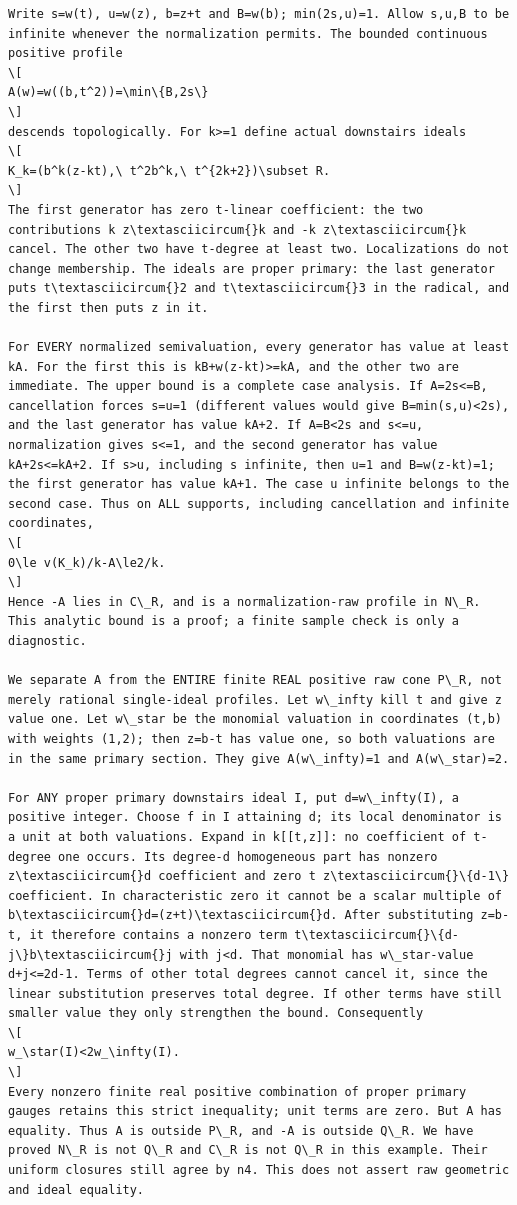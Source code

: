 \documentclass[
]{article}
\begin{document}
\begin{verbatim}
Write s=w(t), u=w(z), b=z+t and B=w(b); min(2s,u)=1. Allow s,u,B to be infinite whenever the normalization permits. The bounded continuous positive profile
\[
A(w)=w((b,t^2))=\min\{B,2s\}
\]
descends topologically. For k>=1 define actual downstairs ideals
\[
K_k=(b^k(z-kt),\ t^2b^k,\ t^{2k+2})\subset R.
\]
The first generator has zero t-linear coefficient: the two contributions k z\textasciicircum{}k and -k z\textasciicircum{}k cancel. The other two have t-degree at least two. Localizations do not change membership. The ideals are proper primary: the last generator puts t\textasciicircum{}2 and t\textasciicircum{}3 in the radical, and the first then puts z in it.

For EVERY normalized semivaluation, every generator has value at least kA. For the first this is kB+w(z-kt)>=kA, and the other two are immediate. The upper bound is a complete case analysis. If A=2s<=B, cancellation forces s=u=1 (different values would give B=min(s,u)<2s), and the last generator has value kA+2. If A=B<2s and s<=u, normalization gives s<=1, and the second generator has value kA+2s<=kA+2. If s>u, including s infinite, then u=1 and B=w(z-kt)=1; the first generator has value kA+1. The case u infinite belongs to the second case. Thus on ALL supports, including cancellation and infinite coordinates,
\[
0\le v(K_k)/k-A\le2/k.
\]
Hence -A lies in C\_R, and is a normalization-raw profile in N\_R. This analytic bound is a proof; a finite sample check is only a diagnostic.

We separate A from the ENTIRE finite REAL positive raw cone P\_R, not merely rational single-ideal profiles. Let w\_infty kill t and give z value one. Let w\_star be the monomial valuation in coordinates (t,b) with weights (1,2); then z=b-t has value one, so both valuations are in the same primary section. They give A(w\_infty)=1 and A(w\_star)=2.

For ANY proper primary downstairs ideal I, put d=w\_infty(I), a positive integer. Choose f in I attaining d; its local denominator is a unit at both valuations. Expand in k[[t,z]]: no coefficient of t-degree one occurs. Its degree-d homogeneous part has nonzero z\textasciicircum{}d coefficient and zero t z\textasciicircum{}\{d-1\} coefficient. In characteristic zero it cannot be a scalar multiple of b\textasciicircum{}d=(z+t)\textasciicircum{}d. After substituting z=b-t, it therefore contains a nonzero term t\textasciicircum{}\{d-j\}b\textasciicircum{}j with j<d. That monomial has w\_star-value d+j<=2d-1. Terms of other total degrees cannot cancel it, since the linear substitution preserves total degree. If other terms have still smaller value they only strengthen the bound. Consequently
\[
w_\star(I)<2w_\infty(I).
\]
Every nonzero finite real positive combination of proper primary gauges retains this strict inequality; unit terms are zero. But A has equality. Thus A is outside P\_R, and -A is outside Q\_R. We have proved N\_R is not Q\_R and C\_R is not Q\_R in this example. Their uniform closures still agree by n4. This does not assert raw geometric and ideal equality.


\end{verbatim}
\end{document}
